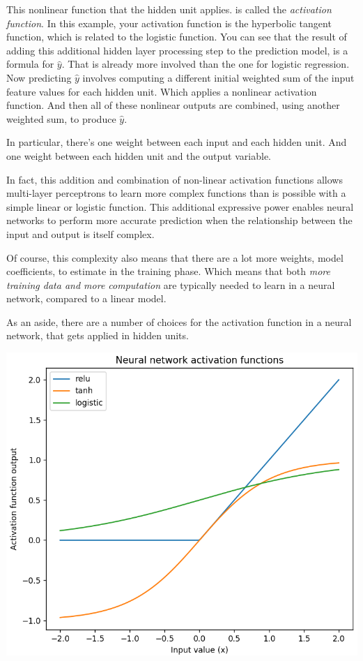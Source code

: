 \begin{multicols}{2}
This nonlinear function that the hidden unit applies. is called the \emph{activation function}. In this example, your activation function is the hyperbolic tangent function, which is related to the logistic function. You can see that the result of adding this additional hidden layer processing step to the prediction model, is a formula for $\hat{y}$. That is already more involved than the one for logistic regression. Now predicting $\hat{y}$ involves computing a different initial weighted sum of the input feature values for each hidden unit. Which applies a nonlinear activation function. And then all of these nonlinear outputs are combined, using another weighted sum, to produce $\hat{y}$. 

In particular, there's one weight between each input and each hidden unit. 
And one weight between each hidden unit and the output variable. 

In fact, this addition and combination of non-linear activation functions allows multi-layer perceptrons to learn more complex functions than is possible with a simple linear or logistic function. This additional expressive power enables neural networks to perform more accurate prediction when the relationship between the input and output is itself complex. 

Of course, this complexity also means that there are a lot more weights, model coefficients, to estimate in the training phase. Which means that both \emph{more training data and more computation} are typically needed to learn in a neural network, compared to a linear model. 

As an aside, there are a number of choices for the activation function in a neural network, that gets applied in hidden units. 

\begin{center}
	\includegraphics[width=\linewidth]{img/Neural-Network-Activation-Functions.png} 
\end{center}


\end{multicols}
